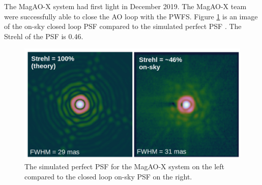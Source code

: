 The MagAO-X system had first light in December 2019. The MagAO-X team were successfully able to close the AO loop with the PWFS. Figure \ref{fig:magaoxonsky} is an image of the on-sky closed loop PSF compared to the simulated perfect PSF \citep{males2020magao}. The Strehl of the PSF is 0.46. 

\begin{figure}
    \centering
    \includegraphics{Chapter Materials/Chapter Three Materials/Magaoxonsky.jpg}
    \caption{The simulated perfect PSF for the MagAO-X system on the left compared to the closed loop on-sky PSF on the right.}
    \label{fig:magaoxonsky}
\end{figure}